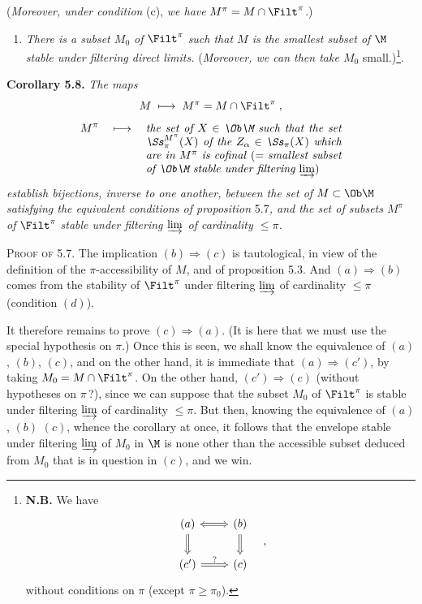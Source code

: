 (\textit{Moreover, under condition} (c), \textit{we have}
$M^\pi = M \cap \Filt^\pi$.)
\begin{enumerate}[label={}]
\item[c$'$)] \textit{There is a subset $M_0$ of} $\Filt^\pi$ \textit{such that $M$ is the smallest subset of $\M$ stable under filtering direct limits.} (\textit{Moreover, we can then take $M_0$} small.)\footnote[22]{\textbf{N.B.} We have
\[
\begin{tikzcd}[ampersand replacement=\&]
(a) \arrow[r, Leftrightarrow] \arrow[d, Rightarrow] \& (b) \arrow[d, Rightarrow] \\
(c') \arrow[r, Rightarrow, "?"] \& (c)
\end{tikzcd}
\quad ,
\]
without conditions on $\pi$ (except $\pi \geq \pi_0$).}.
\end{enumerate}

\textbf{Corollary 5.8.} \textit{The maps}
\[
M \;\longmapsto\; M^\pi = M \cap \Filt^\pi \;,
\]
\[
M^\pi \quad\longmapsto\quad \parbox[t]{0.5\textwidth}{\textit{the set of $X \in \Ob\M$ such that the set $\Ss_\pi^{M^\pi}(X)$ of the $Z_\alpha \in \Ss_\pi(X)$ which are in $M^\pi$ is cofinal} (= \textit{smallest subset of $\Ob\M$ stable under filtering $\varinjlim$})}
\]
\textit{establish bijections, inverse to one another, between the set of $M \subset \Ob\M$ satisfying the equivalent conditions of proposition} 5.7\textit{, and the set of subsets $M^\pi$ of} $\Filt^\pi$ \textit{stable under filtering $\varinjlim$ of cardinality $\leq \pi$.}

\textsc{Proof of} 5.7. The implication $(b) \Longrightarrow (c)$ is tautological, in view of the definition of the $\pi$-accessibility of $M$, and of proposition 5.3. And $(a) \Longrightarrow (b)$ comes from the stability of $\Filt^\pi$ under filtering $\varinjlim$ of cardinality $\leq \pi$ (condition $(d)$).

It therefore remains to prove $(c) \Longrightarrow (a)$. (It is here that we must use the special hypothesis on $\pi$.) Once this is seen, we shall know the equivalence of $(a)$, $(b)$, $(c)$, and on the other hand, it is immediate that $(a) \Longrightarrow (c')$, by
taking $M_0 = M \cap \Filt^\pi$. On the other hand, $(c') \Longrightarrow (c)$ (without hypotheses on $\pi\,$?), since we can suppose that the subset $M_0$ of $\Filt^\pi$ is stable under filtering $\varinjlim$ of cardinality $\leq \pi$. But then, knowing the equivalence of $(a)$, $(b)$ $(c)$, whence the corollary at once, it follows that the envelope stable under filtering $\varinjlim$ of $M_0$ in $\M$ is none other than the accessible subset deduced from $M_0$ that is in question in $(c)$, and we win. %

